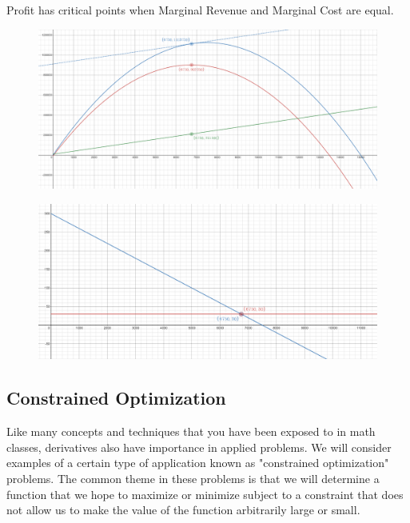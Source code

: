 \begin{tcolorbox}
Profit has critical points when Marginal Revenue and Marginal Cost are equal.
\end{tcolorbox}

\begin{figure}[H]
		\flushleft
		\includegraphics[scale=0.55]{images/appliedOptimization/Optimization_maxRev1.PNG}
		\label{fig:fencing1}
	\end{figure}
	
\begin{figure}[H]
		\flushleft
		\includegraphics[scale=0.5]{images/appliedOptimization/Optimization_maxRev2.PNG}
		\label{fig:fencing1}
	\end{figure}
\newpage
\subsection*{Constrained Optimization}
\noindent Like many concepts and techniques that you have been exposed to in math classes, derivatives also have importance in applied problems. We will consider examples of a certain type of application known as "constrained optimization" problems. The common theme in these problems is that we will determine a function that we hope to maximize or minimize subject to a constraint that does not allow us to make the value of the function arbitrarily large or small.

